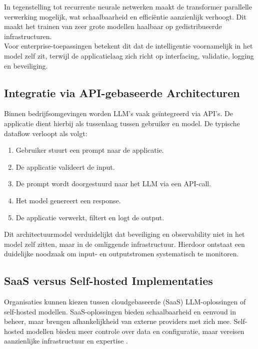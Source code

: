 In tegenstelling tot recurrente neurale netwerken maakt de transformer parallelle verwerking mogelijk, wat schaalbaarheid en efficiëntie aanzienlijk verhoogt. Dit maakt het trainen van zeer grote modellen haalbaar op gedistribueerde infrastructuren.\\

Voor enterprise-toepassingen betekent dit dat de intelligentie voornamelijk in het model zelf zit, terwijl de applicatielaag zich richt op interfacing, validatie, logging en beveiliging.

\subsection{Integratie via API-gebaseerde Architecturen}

Binnen bedrijfsomgevingen worden LLM’s vaak geïntegreerd via API’s. De applicatie dient hierbij als tussenlaag tussen gebruiker en model. De typische dataflow verloopt als volgt:

\begin{enumerate}
    \item Gebruiker stuurt een prompt naar de applicatie.
    \item De applicatie valideert de input.
    \item De prompt wordt doorgestuurd naar het LLM via een API-call.
    \item Het model genereert een response.
    \item De applicatie verwerkt, filtert en logt de output.
\end{enumerate}

Dit architectuurmodel verduidelijkt dat beveiliging en observability niet in het model zelf zitten, maar in de omliggende infrastructuur. Hierdoor ontstaat een duidelijke noodzaak om input- en outputstromen systematisch te monitoren.

\subsection{SaaS versus Self-hosted Implementaties}

Organisaties kunnen kiezen tussen cloudgebaseerde (SaaS) LLM-oplossingen of self-hosted modellen. SaaS-oplossingen bieden schaalbaarheid en eenvoud in beheer, maar brengen afhankelijkheid van externe providers met zich mee. Self-hosted modellen bieden meer controle over data en configuratie, maar vereisen aanzienlijke infrastructuur en expertise \autocite{bommasani2021opportunities}.\\

